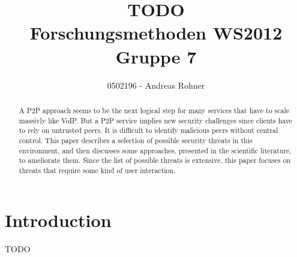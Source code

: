 \documentclass[a4paper,10pt]{article}
\title{TODO\\
Forschungsmethoden WS2012\\
Gruppe 7}
\author{0502196 - Andreas Rohner\\
}
\begin{document}
\maketitle

\begin{abstract}
A P2P approach seems to be the next logical step for many services that have to
scale massivly like VoIP. But a P2P service implies new security challenges
since clients have to rely on untrusted peers. It is difficult to identify
malicious peers without central control. This paper describes a selection of
possible security threats in this
environment, and then discusses some approaches, presented in the scientific
literature, to ameliorate them. Since the list of possible threats is extensive,
this paper focuses on threats that require some kind of user interaction.
\end{abstract}

\section{Introduction}
TODO
\end{document}
